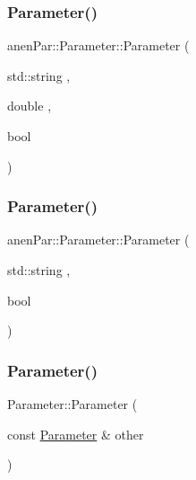 \subsubsection{\texorpdfstring{Parameter()}{Parameter()}\hspace{0.1cm}{\footnotesize\ttfamily [4/6]}}
{\footnotesize\ttfamily anen\+Par\+::\+Parameter\+::\+Parameter (\begin{DoxyParamCaption}\item[{std\+::string}]{,  }\item[{double}]{,  }\item[{bool}]{ }\end{DoxyParamCaption})}

\mbox{\label{classanen_par_1_1_parameter_ac5eef55d40acfe03a9a741c5606ef0fc}} 
\subsubsection{\texorpdfstring{Parameter()}{Parameter()}\hspace{0.1cm}{\footnotesize\ttfamily [5/6]}}
{\footnotesize\ttfamily anen\+Par\+::\+Parameter\+::\+Parameter (\begin{DoxyParamCaption}\item[{std\+::string}]{,  }\item[{bool}]{ }\end{DoxyParamCaption})}

\mbox{\label{classanen_par_1_1_parameter_ad3f5d861da24673d97bd1bd206b0b89a}} 
\subsubsection{\texorpdfstring{Parameter()}{Parameter()}\hspace{0.1cm}{\footnotesize\ttfamily [6/6]}}
{\footnotesize\ttfamily Parameter\+::\+Parameter (\begin{DoxyParamCaption}\item[{const \mbox{\hyperlink{classanen_par_1_1_parameter}{Parameter}} \&}]{other }\end{DoxyParamCaption})}

